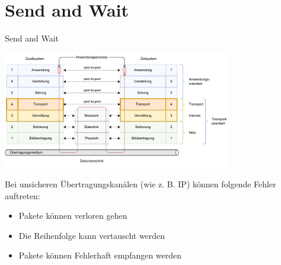 \section{Send and Wait}

\begin{defi}{Send and Wait}
    \begin{center}
        \includegraphics[width=0.75\textwidth]{includes/figures/defi_iso_osi_transport_und_vermittlung.pdf}
    \end{center}

    Bei unsicheren Übertragungskanälen (wie z. B. IP) können folgende Fehler auftreten:
    \begin{itemize}
        \item Pakete können verloren gehen
        \item Die Reihenfolge kann vertauscht werden
        \item Pakete können Fehlerhaft empfangen werden
    \end{itemize}
\end{defi}

